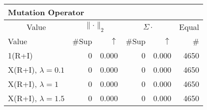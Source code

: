 \begin{center}
\renewcommand{\tabcolsep}{4pt}
\renewcommand{\arraystretch}{1.1}
\begin{customnormal}
\begin{tabular}{lrrrrr}
\multicolumn{6}{l}{Mutation Operator}\\
\toprule
\multicolumn{1}{c}{Value} & \multicolumn{2}{c}{$\lVert \cdot \rVert_2$} & \multicolumn{2}{c}{$\Sigma \cdot$} & \multicolumn{1}{c}{Equal} \\ 
\cmidrule(lr){1-1} \cmidrule(lr){2-3} \cmidrule(lr){4-5}  \cmidrule(lr){6-6}
Value & \#Sup & $\uparrow$ & \#Sup & $\uparrow$ & \# \\ 
\midrule
1(R+I) & 0 & 0.000 & 0 & 0.000 & 4650 \\ 
X(R+I), $\lambda=0.1$ & 0 & 0.000 & 0 & 0.000 & 4650 \\ 
X(R+I), $\lambda=1$ & 0 & 0.000 & 0 & 0.000 & 4650 \\ 
X(R+I), $\lambda=1.5$ & 0 & 0.000 & 0 & 0.000 & 4650 \\ 
\bottomrule
\end{tabular}


\end{customnormal}
\end{center}
